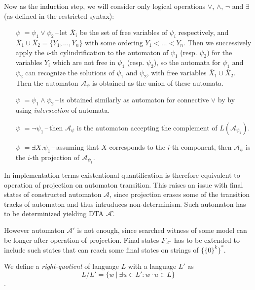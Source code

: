 Now as the induction step, we will consider only logical operations $\vee$,
$\wedge$, $\neg$ and $\exists$ (as defined in the restricted syntax):
\begin{itemize}
 \item[$\psi$]$ = \psi_1 \vee \psi_2$\,--\,let $\overline{X}_i$ be the set of
 free variables of $\psi_i$ respectively, and $\overline{X}_1 \cup
 \overline{X}_2 = \{Y_1,\ldots,Y_n\}$ with some ordering $Y_1 < \ldots < Y_n$.
 Then we successively apply the $i$-th cylindrification to the automaton of
 $\psi_1$ (resp. $\psi_2$) for the variables $Y_i$ which are not free in
 $\psi_1$ (resp. $\psi_2$), so the automata for $\psi_1$ and $\psi_2$ can
 recognize the solutions of $\psi_1$ and $\psi_2$, with free variables
 $\overline{X}_1 \cup \overline{X}_2$. Then the automaton $\mathcal{A}_\psi$ is
 obtained as the union of these automata.
 \item[$\psi$]$ = \psi_1 \wedge \psi_2$\,--\,is obtained similarly as automaton
 for connective $\vee$ by by using \emph{intersection} of automata.
 \item[$\psi$]$ = \neg\psi_1$\,--\,then $\mathcal{A}_\psi$ is the automaton
 accepting the complement of $L(\mathcal{A}_{\psi_1})$.
 \item[$\psi$]$ = \exists X.\psi_1$\,--\,assuming that $X$ corresponds to the
 $i$-th component, then $\mathcal{A}_\psi$ is the $i$-th projection of
 $\mathcal{A}_{\psi_1}$.
\end{itemize}

In implementation terms existentional quantification is therefore equivalent to
operation of projection on automaton transition. This raises an issue with final
states of constructed automaton $\mathcal{A}$, since projection erases some of
the transition tracks of automaton and thus intruduces non-determinism. Such automaton has to
be determinized yielding DTA $\mathcal{A}$'.

However automaton $\mathcal{A}'$ is not enough, since searched witness of some
model can be longer after operation of projection. Final states
$F_{\mathcal{A}'}$ has to be extended to include such states that can reach some
final states on strings of $\{\{0\}^k\}^*$. 

\begin{defz}
We define a \emph{right-quotient} of language $L$ with a language $L'$ as
\begin{equation}
 L / L' = \{w\ |\ \exists u \in L' : w\cdot u \in L\}
\end{equation}.
\end{defz}

